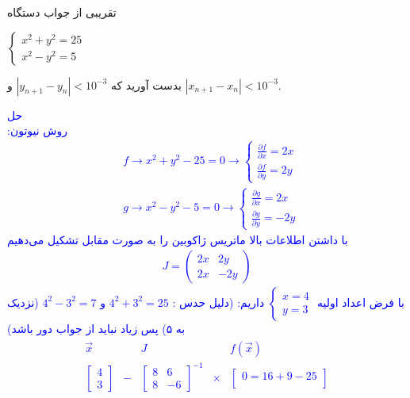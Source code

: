 تقریبی از جواب دستگاه
\begin{center}
$
    \begin{cases}
    x^2 + y^2 = 25 \\
    x^2 - y^2 = 5
    \end{cases}
$
\end{center}
بدست آورید که 
$|y_{n+1} - y_n| < 10^{-3}$
و
$|x_{n+1} - x_n| < 10^{-3}$.

\textcolor{blue}{
حل 
\\
روش نیوتون:
\begin{align*}
    &f \rightarrow x^2  + y^2 - 25= 0 \rightarrow \begin{cases}
        \frac{\partial f}{\partial x} = 2x \\
        \frac{\partial f}{\partial y} = 2y
    \end{cases}
    \\
    &g \rightarrow x^2 - y^2 - 5 = 0 \rightarrow 
    \begin{cases}
        \frac{\partial g}{\partial x} = 2x \\
        \frac{\partial g}{\partial y} = -2y
    \end{cases}
\end{align*}
با داشتن اطلاعات بالا ماتریس ژاکوبین را به صورت مقابل تشکیل می‌دهیم
\begin{align*}
    J = \begin{pmatrix}
        2x & 2y \\
        2x & -2y
    \end{pmatrix}
\end{align*}
با فرض اعداد اولیه 
$\begin{cases}
    x = 4 \\
    y = 3
\end{cases}$
داریم:
(دلیل حدس :
$4^2 + 3^2 = 25$
و
$4^2 - 3^2 = 7$
(نزدیک به ۵)
پس زیاد نباید از جواب دور باشد)
\begin{align*}
    &\begin{array}{ccccccc}
\overrightarrow{x} & & J & & f(\overrightarrow{x}) & \\
\begin{bmatrix}
    4 \\
    3
\end{bmatrix} & - & 
\begin{bmatrix}
    8 &  6  \\
    8 & -6
\end{bmatrix}^{-1} & \times &
\begin{bmatrix}
    0 = 16 + 9 - 25 \\

\end{bmatrix}
\end{array}
\end{align*}}
